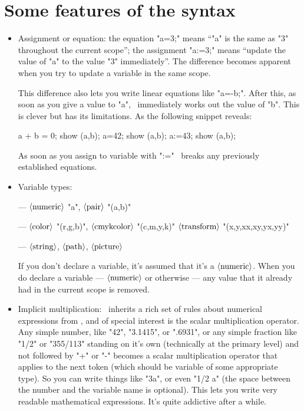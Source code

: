 \documentclass[a4paper,landscape]{article}
\def\mwpic#1#2{\vadjust{\moveright5.5in\vbox to 0pt{\hsize4in\vskip#1\centerline{\texttt{[image: \#2]}}\vss}}}
\def\<#1>{\ensuremath{\langle\hbox{#1}\rangle}}
\begin{document}
\newpage
\section{Some features of the syntax}

\begin{itemize}
    \item Assignment or equation:  the equation "a=3;" means “"a" is the same as "3" throughout the
        current scope”; the assignment "a:=3;" means “update the value of "a" to the value "3"
        immediately”.  The difference becomes apparent when you try to update a
        variable in the same scope.
        \mwpic{0pt}{tiling}

        This difference also lets you write linear equations
        like "a=-b;".  After this, as soon as you give  a value to "a", \MP\ immediately works
        out the value of "b".
        This is clever but has its limitations.  As the following snippet reveals:
\begin{code}
  a + b = 0; show (a,b);  %
  a=42;      show (a,b);  %
  a:=43;     show (a,b);  %
\end{code}
        As soon as you assign to variable with ":=" \MP\ breaks any previously
        established equations.

    \item Variable types:

        —
        \<numeric> "a",
        \<pair> "(a,b)"

        —
        \<color> "(r,g,b)",
        \<cmykcolor> "(c,m,y,k)"
        \<transform> "(x,y,xx,xy,yx,yy)"

        —
        \<string>,
        \<path>,
        \<picture>


        If you don’t declare a variable, it’s assumed that it’s a \<numeric>.
        When you do declare a variable --- \<numeric> or otherwise — any value that it
       already had in the current scope is removed.

    \item Implicit multiplication: \MP\ inherits a rich set of rules about numerical
        expressions from \MF, and of special interest is the scalar multiplication
        operator.  Any simple number, like "42", "3.1415", or ".6931", or any simple
        fraction like "1/2" or "355/113" standing on it’s own (technically at the
        primary level) and not followed by "+" or "-" becomes a scalar
        multiplication operator that applies to the next token (which should be variable
        of some appropriate type).
        So you can write things like "3a", or even "1/2 a"
        (the space between the number and the variable name is optional). This
        lets you write very readable mathematical expressions. It’s quite
        addictive after a while.

\end{itemize}
\end{document}
